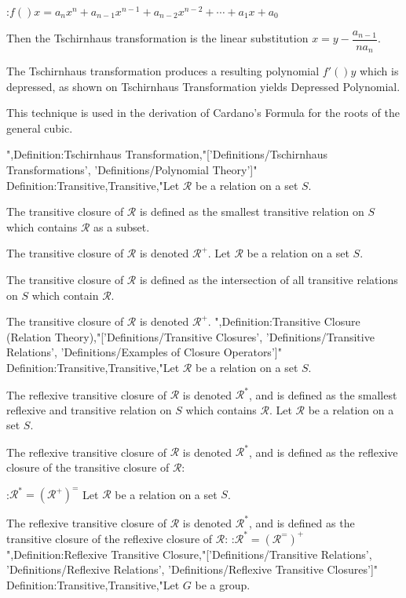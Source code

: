 :$f \left(   \right)x = a_n x^n + a_{n - 1} x^{n - 1} + a_{n - 2} x^{n - 2} + \cdots + a_1 x + a_0$


Then the Tschirnhaus transformation is the linear substitution $x = y - \dfrac {a_{n - 1} } {n a_n}$.

The Tschirnhaus transformation produces a resulting polynomial $f' \left(   \right)y$ which is depressed, as shown on Tschirnhaus Transformation yields Depressed Polynomial.

This technique is used in the derivation of Cardano's Formula for the roots of the general cubic.

",Definition:Tschirnhaus Transformation,"['Definitions/Tschirnhaus Transformations', 'Definitions/Polynomial Theory']"
Definition:Transitive,Transitive,"Let $\mathcal R$ be a relation on a set $S$.


The transitive closure of $\mathcal R$ is defined as the smallest transitive relation on $S$ which contains $\mathcal R$ as a subset.


The transitive closure of $\mathcal R$ is denoted $\mathcal R^+$.
Let $\mathcal R$ be a relation on a set $S$.


The transitive closure of $\mathcal R$ is defined as the intersection of all transitive relations on $S$ which contain $\mathcal R$.


The transitive closure of $\mathcal R$ is denoted $\mathcal R^+$.
",Definition:Transitive Closure (Relation Theory),"['Definitions/Transitive Closures', 'Definitions/Transitive Relations', 'Definitions/Examples of Closure Operators']"
Definition:Transitive,Transitive,"Let $\mathcal R$ be a relation on a set $S$.

The reflexive transitive closure of $\mathcal R$ is denoted $\mathcal R^*$, and is defined as the smallest reflexive and transitive relation on $S$ which contains $\mathcal R$.
Let $\mathcal R$ be a relation on a set $S$.

The reflexive transitive closure of $\mathcal R$ is denoted $\mathcal R^*$, and is defined as the reflexive closure of the transitive closure of $\mathcal R$:

:$\mathcal R^* = \left( \mathcal R^+ \right)^=$
Let $\mathcal R$ be a relation on a set $S$.

The reflexive transitive closure of $\mathcal R$ is denoted $\mathcal R^*$, and is defined as the transitive closure of the reflexive closure of $\mathcal R$:
:$\mathcal R^* = \left( \mathcal R^= \right)^+$
",Definition:Reflexive Transitive Closure,"['Definitions/Transitive Relations', 'Definitions/Reflexive Relations', 'Definitions/Reflexive Transitive Closures']"
Definition:Transitive,Transitive,"Let $G$ be a group.

